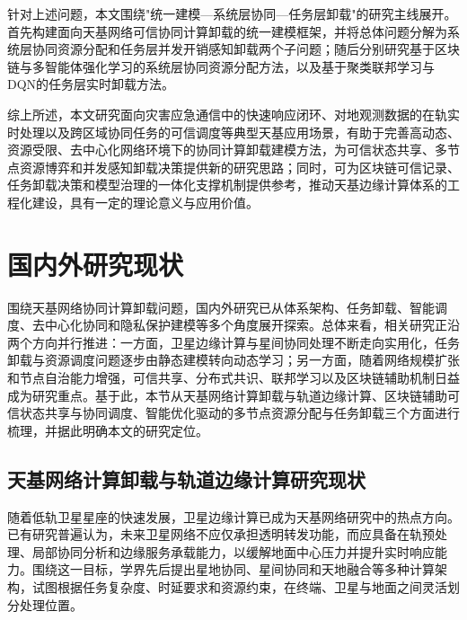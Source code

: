 针对上述问题，本文围绕"统一建模—系统层协同—任务层卸载"的研究主线展开。首先构建面向天基网络可信协同计算卸载的统一建模框架，并将总体问题分解为系统层协同资源分配和任务层并发开销感知卸载两个子问题；随后分别研究基于区块链与多智能体强化学习的系统层协同资源分配方法，以及基于聚类联邦学习与DQN的任务层实时卸载方法。

综上所述，本文研究面向灾害应急通信中的快速响应闭环、对地观测数据的在轨实时处理以及跨区域协同任务的可信调度等典型天基应用场景，有助于完善高动态、资源受限、去中心化网络环境下的协同计算卸载建模方法，为可信状态共享、多节点资源博弈和并发感知卸载决策提供新的研究思路；同时，可为区块链可信记录、任务卸载决策和模型治理的一体化支撑机制提供参考，推动天基边缘计算体系的工程化建设，具有一定的理论意义与应用价值。

\section{国内外研究现状}

围绕天基网络协同计算卸载问题，国内外研究已从体系架构、任务卸载、智能调度、去中心化协同和隐私保护建模等多个角度展开探索。总体来看，相关研究正沿两个方向并行推进：一方面，卫星边缘计算与星间协同处理不断走向实用化，任务卸载与资源调度问题逐步由静态建模转向动态学习；另一方面，随着网络规模扩张和节点自治能力增强，可信共享、分布式共识、联邦学习以及区块链辅助机制日益成为研究重点。基于此，本节从天基网络计算卸载与轨道边缘计算、区块链辅助可信状态共享与协同调度、智能优化驱动的多节点资源分配与任务卸载三个方面进行梳理，并据此明确本文的研究定位。

\subsection{天基网络计算卸载与轨道边缘计算研究现状}

随着低轨卫星星座的快速发展，卫星边缘计算已成为天基网络研究中的热点方向。已有研究普遍认为，未来卫星网络不应仅承担透明转发功能，而应具备在轨预处理、局部协同分析和边缘服务承载能力，以缓解地面中心压力并提升实时响应能力\cite{Hu2023SECSurvey,Yin2025OECSurvey,Huang2024ICNLSMC,Saad2024NTNRel1718,Mahboob2024AINTN}。围绕这一目标，学界先后提出星地协同、星间协同和天地融合等多种计算架构，试图根据任务复杂度、时延要求和资源约束，在终端、卫星与地面之间灵活划分处理位置。

